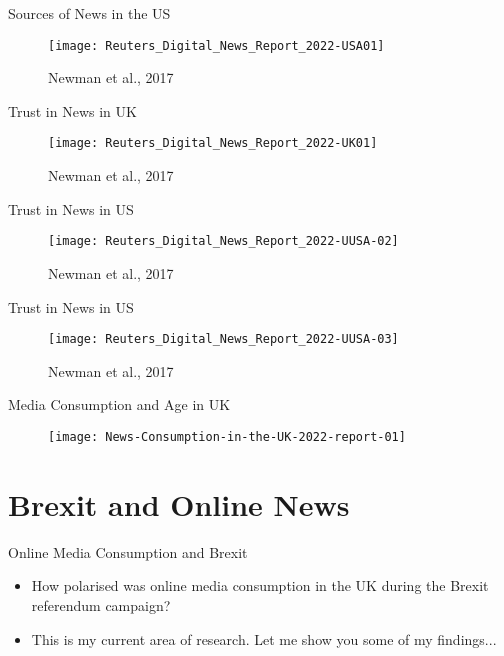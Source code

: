 \documentclass{beamer}
\begin{document}
\begin{frame}{Sources of News in the US}
    \begin{figure}
        \centering
        \texttt{[image: Reuters\_Digital\_News\_Report\_2022-USA01]}
        \caption{Newman et al., 2017}
        \label{fig:my_label}
    \end{figure}
\end{frame}


\begin{frame}{Trust in News in UK}
    \begin{figure}
        \centering
        \texttt{[image: Reuters\_Digital\_News\_Report\_2022-UK01]}
        \caption{Newman et al., 2017}
        \label{fig:my_label}
    \end{figure}
\end{frame}

\begin{frame}{Trust in News in US}
    \begin{figure}
        \centering
        \texttt{[image: Reuters\_Digital\_News\_Report\_2022-UUSA-02]}
        \caption{Newman et al., 2017}
        \label{fig:my_label}
    \end{figure}
\end{frame}

\begin{frame}{Trust in News in US}
    \begin{figure}
        \centering
        \texttt{[image: Reuters\_Digital\_News\_Report\_2022-UUSA-03]}
        \caption{Newman et al., 2017}
        \label{fig:my_label}
    \end{figure}
\end{frame}


\begin{frame}{Media Consumption and Age in UK}
    \begin{figure}
        \centering
        \texttt{[image: News-Consumption-in-the-UK-2022-report-01]}
        \label{fig:my_label}
    \end{figure}
\end{frame}

\section{Brexit and Online News}

\begin{frame}{Online Media Consumption and Brexit}
    \begin{itemize}
        \item How polarised was online media consumption in the UK during the Brexit referendum campaign?
        \item This is my current area of research. Let me show you some of my findings...

    \end{itemize}
\end{frame}
\end{document}
